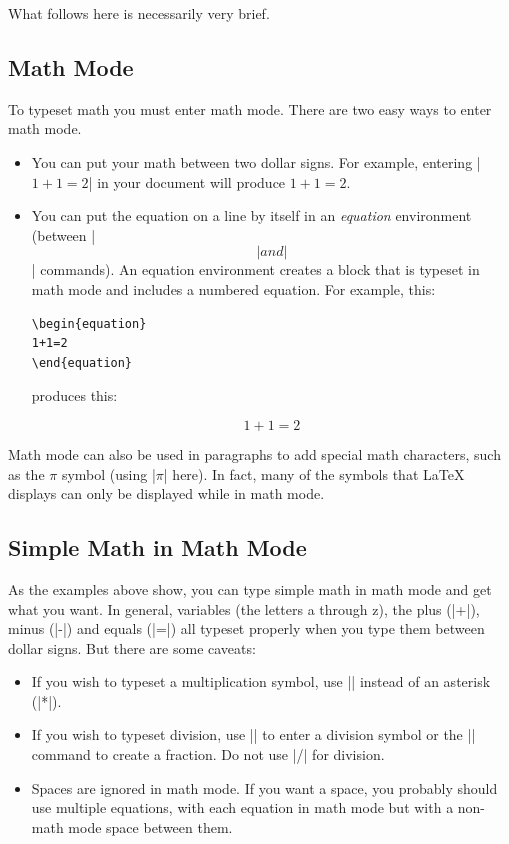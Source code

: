 What follows here is necessarily very brief. 

\subsection{Math Mode}
To typeset math you must enter math mode. There are two easy ways to
enter math mode. 

\begin{itemize}
\item You can put your math between two dollar signs. For example,
  entering |$1+1=2$| in your document will produce $1+1=2$.
\item You can put the equation on a line by itself in an \emph{equation}
  environment (\eg between |\begin{equation}| and |\end{equation}|
  commands). An equation environment creates a block that is typeset in
  math mode and includes a numbered equation. For example, this:
\begin{Verbatim}
\begin{equation}
1+1=2
\end{equation}
\end{Verbatim}

produces this:

\begin{equation}
1+1=2
\end{equation}
\end{itemize}

Math mode can also be used in paragraphs to add special math characters, such
as the $\pi$ symbol (using |$\pi$| here).  In fact, many of the symbols that
\LaTeX{} displays can only be displayed while in math mode.

\subsection{Simple Math in Math Mode}

As the examples above show, you can type simple math in math mode and get what
you want. In general, variables (the letters a through z), the plus (|+|),
minus (|-|) and equals (|=|) all typeset properly when you type them between
dollar signs.  But there are some caveats:

\begin{itemize}
\item If you wish to typeset a multiplication symbol, use |\times| instead
of an asterisk (|*|).
\item If you wish to typeset division, use |\div| to enter a division
  symbol or the |\frac| command to create a fraction. Do not use |/|
  for division. 
\item Spaces are ignored in math mode. If you want a space, you
  probably should use multiple equations, with each equation
  in math mode but with a non-math mode space between them.
\end{itemize}

